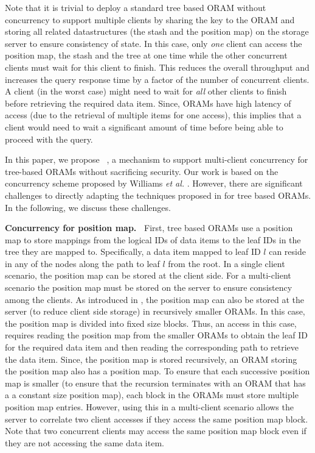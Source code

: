   Note that it is trivial to deploy a standard tree based ORAM without 
  concurrency to support multiple clients by sharing the key to the ORAM 
  and storing all related datastructures (the stash and the position map) on the 
  storage server to ensure consistency of state. 
  In this case, only {\em one} client can access the position map, the stash 
  and the tree at one time while the other concurrent clients 
  must wait for this client to finish. This reduces the overall throughput and increases the 
  query response time by a factor of the number of concurrent clients. A client (in the worst case) 
  might need to wait for {\em all} other clients to finish before retrieving the required data item. 
  Since, ORAMs have high latency of access (due to the retrieval of multiple items for one access), 
  this implies that a client would need to wait a significant amount of time before being able to proceed 
  with the query. 

  In this paper, we propose \sysname~, a mechanism to support multi-client concurrency for tree-based ORAMs 
  without sacrificing security. Our work is based on the concurrency scheme proposed by 
  Williams {\em et al.} \cite{privatefs}. However, there are significant challenges to directly 
  adapting the techniques proposed in \cite{privatefs} for tree based ORAMs. In the following, we discuss 
  these challenges.

  {\bf Concurrency for position map.~}
  First, tree based ORAMs use a position map to store mappings from the logical IDs of data items to the leaf IDs in the tree they 
  are mapped to. Specifically, a data item mapped to leaf ID $l$ can reside in any of the nodes along the 
  path to leaf $l$ from the root. In a single client scenario, the position map can be stored at the client side. For a 
  multi-client scenario the position map must be stored on the server to ensure consistency among the clients. 
  As introduced in \cite{binarytreeoram}, the position map can also be stored at the server (to reduce client side storage) 
  in recursively smaller ORAMs. In this case, the position map is divided into fixed size blocks. 
  Thus, an access in this case, requires reading the position map from the smaller ORAMs to obtain 
  the leaf ID for the required data item and then reading the corresponding path to retrieve the data item. 
  Since, the position map is 
  stored recursively, an ORAM storing the position map also has a position map. To ensure that each successive position map is smaller 
  (to ensure that the recursion terminates with an ORAM that has a 
  a constant size position map), each block in the ORAMs must store multiple position map entries. However, using this in a 
  multi-client scenario allows the server to correlate two client accesses if they access the same position map block. 
  Note that two concurrent clients may access the same position map block even if they are not accessing the same data item.

